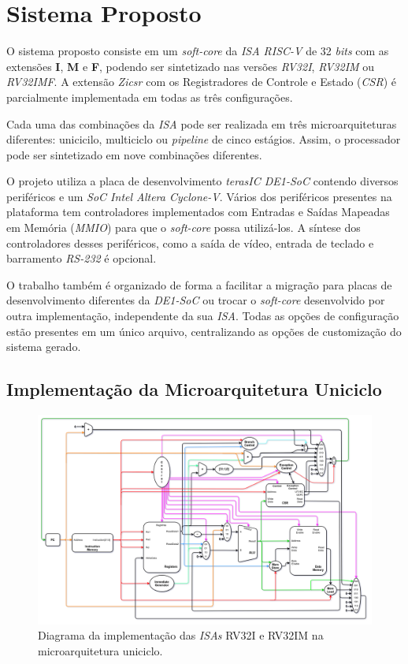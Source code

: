 \chapter{Sistema Proposto}\label{cap_proposta}

{ O sistema proposto consiste em um \textit{soft-core} da \textit{ISA RISC-V}
    de 32 \textit{bits} com as extensões \textbf{I}, \textbf{M} e \textbf{F},
    podendo ser sintetizado nas versões \textit{RV32I}, \textit{RV32IM} ou
    \textit{RV32IMF}. A extensão \textit{Zicsr} com os Registradores de Controle
    e Estado (\textit{CSR}) é parcialmente implementada em todas as três
    configurações.
}

{ Cada uma das combinações da \textit{ISA} pode ser realizada em três
    microarquiteturas diferentes: unicicilo, multiciclo ou \textit{pipeline} de
    cinco estágios. Assim, o processador pode ser sintetizado em nove
    combinações diferentes.
}

{ O projeto utiliza a placa de desenvolvimento \textit{terasIC DE1-SoC} contendo
    diversos periféricos e um \textit{SoC Intel Altera Cyclone-V}. Vários dos
    periféricos presentes na plataforma tem controladores implementados com
    Entradas e Saídas Mapeadas em Memória (\textit{MMIO}) para que o
    \textit{soft-core} possa utilizá-los. A síntese dos controladores desses
    periféricos, como a saída de vídeo, entrada de teclado e barramento
    \textit{RS-232} é opcional.
}

{ O trabalho também é organizado de forma a facilitar a migração para placas de
    desenvolvimento diferentes da \textit{DE1-SoC} ou trocar o \textit{soft-core}
    desenvolvido por outra implementação, independente da sua \textit{ISA}.
    Todas as opções de configuração estão presentes em um único arquivo,
    centralizando as opções de customização do sistema gerado.
}


\section{Implementação da Microarquitetura Uniciclo}

    \begin{figure}[H]
    \centering
        \includegraphics[width=1\linewidth]{../images/uarch_diagrams/singlecycle-RV32I-RV32IM.png}
        \caption{Diagrama da implementação das \textit{ISAs} RV32I e RV32IM na
        microarquitetura uniciclo.}\label{fig:diagram_rv32i_uni}
    \end{figure}

